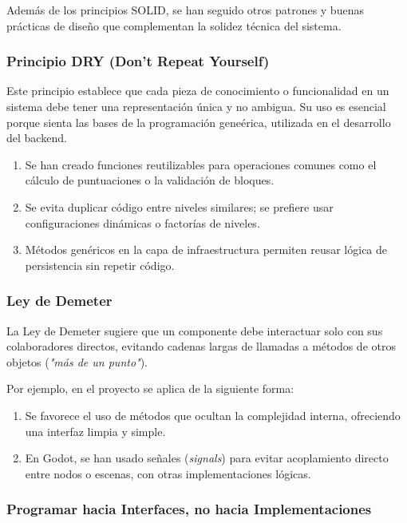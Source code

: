 Además de los principios SOLID, se han seguido otros patrones y buenas prácticas de diseño que complementan la solidez técnica del sistema.

\subsubsection{Principio DRY (Don't Repeat Yourself)}

Este principio establece que cada pieza de conocimiento o funcionalidad en un sistema debe tener una representación única y no ambigua. Su uso es esencial porque sienta las bases de la programación geneérica, utilizada en el desarrollo del backend.

\begin{enumerate}
	\item Se han creado funciones reutilizables para operaciones comunes como el cálculo de puntuaciones o la validación de bloques.
	
	\item Se evita duplicar código entre niveles similares; se prefiere usar configuraciones dinámicas o factorías de niveles.
	
	\item Métodos genéricos en la capa de infraestructura permiten reusar lógica de persistencia sin repetir código.
\end{enumerate}

\subsubsection{Ley de Demeter}

La Ley de Demeter sugiere que un componente debe interactuar solo con sus colaboradores directos, evitando cadenas largas de llamadas a métodos de otros objetos (\textit{"más de un punto"}).

Por ejemplo, en el proyecto se aplica de la siguiente forma: 
\begin{enumerate}
	\item  Se favorece el uso de métodos que ocultan la complejidad interna, ofreciendo una interfaz limpia y simple.
	
	\item En Godot, se han usado señales (\textit{signals}) para evitar acoplamiento directo entre nodos o escenas, con otras implementaciones lógicas.
\end{enumerate}

\subsubsection{Programar hacia Interfaces, no hacia Implementaciones}

